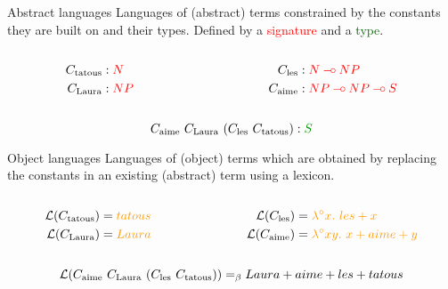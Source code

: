 \documentclass{beamer}
\def\limp {\mathbin{{-}\mkern-3.5mu{\circ}}}
\begin{document}
\begin{frame}
  \begin{block}{Abstract languages}
    Languages of (abstract) terms constrained by the constants they are
    built on and their types. Defined by a \textcolor{red}{signature}
    and a \textcolor{darkgreen}{type}.

    \begin{columns}[t]
      \begin{column}{0.5\textwidth}
        \begin{align*}
          C_{\textrm{tatous}} &: \textcolor{red}{N} \\
          C_{\textrm{Laura}} &: \textcolor{red}{NP}
        \end{align*}
      \end{column}
      \begin{column}{0.5\textwidth}
        \begin{align*}
          \synt{les} &: \textcolor{red}{N \limp NP} \\
          \synt{aime} &: \textcolor{red}{NP \limp NP \limp S}
        \end{align*}
      \end{column}
    \end{columns}

    $$\synt{aime}\ \synt{Laura}\ (\synt{les}\ \synt{tatous}) :
    \textcolor{darkgreen}{S}$$
  \end{block}

  \begin{block}{Object languages}
    Languages of (object) terms which are obtained by replacing the
    constants in an existing (abstract) term using a \textcolor{darkgold}{lexicon}.

    \begin{columns}[t]
      \begin{column}{0.5\textwidth}
        \begin{align*}
          \mathcal{L}(\synt{tatous}) &= \textcolor{darkgold}{tatous} \\
          \mathcal{L}(\synt{Laura}) &= \textcolor{darkgold}{Laura}
        \end{align*}
      \end{column}
      \begin{column}{0.5\textwidth}
        \begin{align*}
          \mathcal{L}(\synt{les}) &= \textcolor{darkgold}{\lambda^{\circ} x.\ les + x} \\
          \mathcal{L}(\synt{aime}) &= \textcolor{darkgold}{\lambda^{\circ} x y.\ x + aime + y}
        \end{align*}
      \end{column}
    \end{columns}

    $$\mathcal{L}(\synt{aime}\ \synt{Laura}\ (\synt{les}\ \synt{tatous}))
    =_{\beta} Laura + aime + les + tatous$$
  \end{block}
\end{frame}
\end{document}
